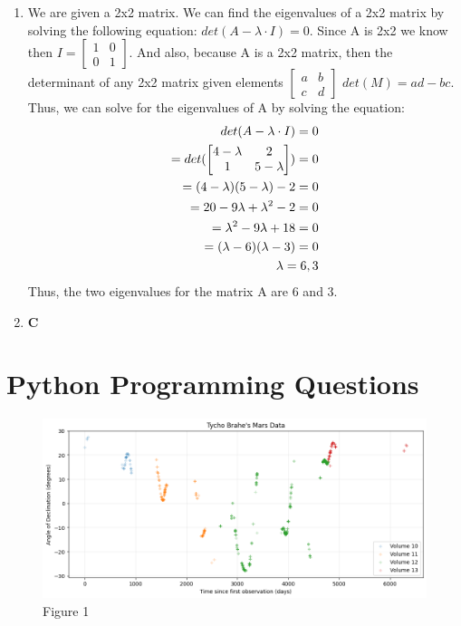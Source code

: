 \documentclass[12pt]{article}
\begin{document}
\begin{enumerate}
\begin{enumerate}
    \item 
      We are given a 2x2 matrix. We can find the eigenvalues of a 2x2 matrix by solving the following equation: 
      $det(A- \lambda \cdot I) = 0$. Since A is 2x2 we know then $I = \begin{bmatrix} 1 & 0 \\ 0 & 1 \end{bmatrix}$. And also, 
      because A is a 2x2 matrix, then the determinant of any 2x2 matrix given elements $ \begin{bmatrix} a & b \\ c & d \end{bmatrix}$ 
      $det(M) = ad-bc$. Thus, we can solve for the eigenvalues of A by solving the equation: \\ 
      \begin{align}
        det(A - \lambda \cdot I) = 0 \notag \\ 
       = det(\begin{bmatrix} 4-\lambda & 2 \\ 1 & 5-\lambda \end{bmatrix}) = 0 \notag \\
        = (4-\lambda)(5-\lambda) - 2 = 0 \notag \\ 
        = 20 - 9 \lambda + \lambda^{2} - 2 = 0 \notag \\ 
        = \lambda^2 - 9\lambda + 18 = 0 \notag \\ 
        = (\lambda - 6)(\lambda - 3) = 0 \notag \\ 
        \lambda = 6, 3 \notag
      \end{align}
     Thus, the two eigenvalues for the matrix A are 6 and 3. 
    \item  \textbf{C}
 \end{enumerate}
\end{enumerate}

\section{Python Programming Questions}

  \begin{figure}[H]
      \centering
      \includegraphics[width=\textwidth]{fig1.png}
      \caption{Figure 1}
      \label{fig:fig1}
  \end{figure}
\end{document}
